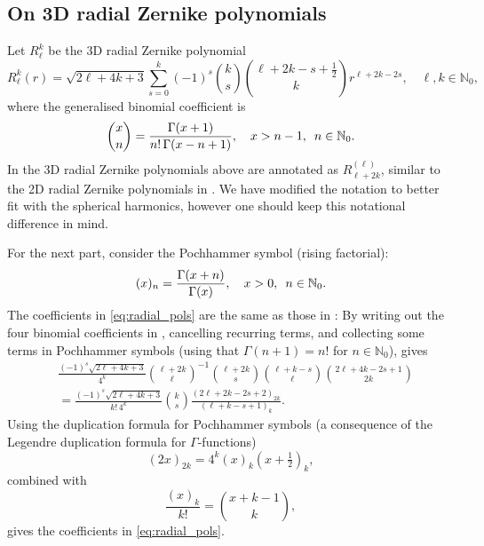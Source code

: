\documentclass[reqno]{amsart}
\numberwithin{equation}{section}
\numberwithin{figure}{section}
\numberwithin{table}{section}
\theoremstyle{plain}
\theoremstyle{definition}
\theoremstyle{remark}
\newcommand{\N}{\mathbb{N}}
\begin{document}
\subsection{On 3D radial Zernike polynomials}
    
Let $R_\ell^k$ be the 3D radial Zernike polynomial
%
\begin{equation} \label{eq:radial_pols}
    R_\ell^k(r) = \sqrt{2 \ell + 4 k + 3}\sum^k_{s = 0} (-1)^s\binom{k}{s}\binom{\ell+2k-s+\tfrac{1}{2}}{k} r^{\ell+2k-2s}, \quad \ell, k \in\N_0,
\end{equation}
%
where the generalised binomial coefficient is
%
\begin{equation*}
    \binom{x}{n} = \frac{\Gamma(x+1)}{n!\,\Gamma(x-n+1)}, \quad x > n-1,\enskip n\in \N_0. 
\end{equation*}
%
In \cite{Mathar2009} the 3D radial Zernike polynomials above are annotated as $R^{(\ell)}_{\ell+2k}$, similar to the 2D radial Zernike polynomials in \cite{Garde2024a}. We have modified the notation to better fit with the spherical harmonics, however one should keep this notational difference in mind. 

For the next part, consider the Pochhammer symbol (rising factorial):
%
\begin{equation*}
    (x)_n = \frac{\Gamma(x+n)}{\Gamma(x)}, \quad x > 0,\enskip n\in \N_0.
\end{equation*}
%
The coefficients in \eqref{eq:radial_pols} are the same as those in \cite{Mathar2009}: By writing out the four binomial coefficients in \cite{Mathar2009}, cancelling recurring terms, and collecting some terms in Pochhammer symbols (using that $\Gamma(n+1) = n!$ for $n\in\N_0$), gives
%
\begin{align*}
    &\frac{(-1)^s\sqrt{2 \ell + 4 k + 3}}{4^k}\binom{\ell+2k}{\ell}^{-1} \binom{\ell+2k}{s}\binom{\ell+k-s}{\ell}\binom{2\ell+4k-2s+1}{2k} \\
    &= \frac{(-1)^s\sqrt{2 \ell + 4 k + 3}}{k!\,4^k}\binom{k}{s}\frac{(2\ell+2k-2s+2)_{2k}}{(\ell+k-s+1)_{k}}.
\end{align*}
%
Using the duplication formula for Pochhammer symbols \cite[§5.2(iii) Eq.~5.2.8]{NIST} (a consequence of the Legendre duplication formula for $\Gamma$-functions)
%
\begin{equation*}
    (2x)_{2k} = 4^k(x)_k(x+\tfrac{1}{2})_k,
\end{equation*}
%
combined with 
%
\begin{equation*}
    \frac{(x)_k}{k!} = \binom{x+k-1}{k},
\end{equation*}
%
gives the coefficients in \eqref{eq:radial_pols}.
\end{document}
